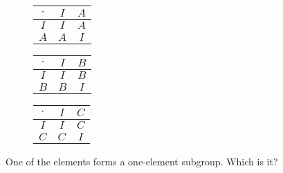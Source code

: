 \documentclass[../gatm_answers.tex]{subfiles}
\begin{document}
\begin{figure}[h]
	\begin{center}
		\begin{minipage}[b]{0.3\textwidth}
			\centering
			\begin{tabular}{c|cc}
				\hline
				$\cdot$ & $I$ & $A$ \\ \hline
				\rowcolor{light-gray}
				$I$ & $I$ & $A$ \\
				$A$ & $A$ & $I$ \\ \hline
			\end{tabular}
			\vspace*{0.5\baselineskip}
		\end{minipage}
		\hfill
		\begin{minipage}[b]{0.3\textwidth}
			\centering
			\begin{tabular}{c|cc}
				\hline
				$\cdot$ & $I$ & $B$ \\ \hline
				\rowcolor{light-gray}
				$I$ & $I$ & $B$ \\
				$B$ & $B$ & $I$ \\ \hline
			\end{tabular}
			\vspace*{0.5\baselineskip}
		\end{minipage}
		\hfill
		\begin{minipage}[b]{0.3\textwidth}
			\centering
			\begin{tabular}{c|cc}
				\hline
				$\cdot$ & $I$ & $C$ \\ \hline
				\rowcolor{light-gray}
				$I$ & $I$ & $C$ \\
				$C$ & $C$ & $I$ \\ \hline
			\end{tabular}
			\vspace*{0.5\baselineskip}
		\end{minipage}
	\end{center}
	\vspace*{-2\baselineskip}
	\begin{center}
		\begin{minipage}[t]{\textwidth}
			\label{fig:two_elem_subgroups}
		\end{minipage}
	\end{center}
	\vspace*{-2\baselineskip}
\end{figure}

\begin{outer_problem}
\item One of the elements forms a one-element subgroup. Which is it?
\end{outer_problem}
\end{document}
